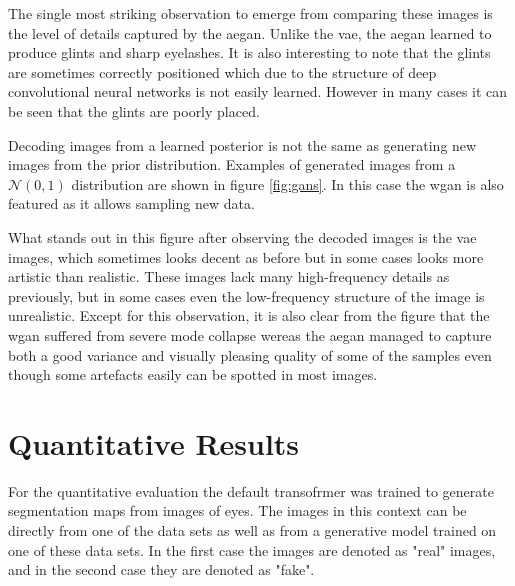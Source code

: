 The single most striking observation to emerge from comparing these images is the level of details captured by the \acrshort{aegan}. Unlike the \acrshort{vae}, the \acrshort{aegan} learned to produce glints and sharp eyelashes. It is also interesting to note that the glints are sometimes correctly positioned which due to the structure of deep convolutional neural networks is not easily learned. However in many cases it can be seen that the glints are poorly placed.

Decoding images from a learned posterior is not the same as generating new images from the prior distribution. Examples of generated images from a $\mathcal{N}(0, 1)$ distribution are shown in figure \ref{fig:gans}. In this case the \acrshort{wgan} is also featured as it allows sampling new data. 

What stands out in this figure after observing the decoded images is the \acrshort{vae} images, which sometimes looks decent as before but in some cases looks more artistic than realistic. These images lack many high-frequency details as previously, but in some cases even the low-frequency structure of the image is unrealistic. Except for this observation, it is also clear from the figure that the \acrshort{wgan} suffered from severe mode collapse wereas the \acrshort{aegan} managed to capture both a good variance and visually pleasing quality of some of the samples even though some artefacts easily can be spotted in most images.



\section{Quantitative Results}
For the quantitative evaluation the default transofrmer was trained to generate segmentation maps from images of eyes. The images in this context can be directly from one of the data sets as well as from a generative model trained on one of these data sets. In the first case the images are denoted as "real" images, and in the second case they are denoted as "fake". 

